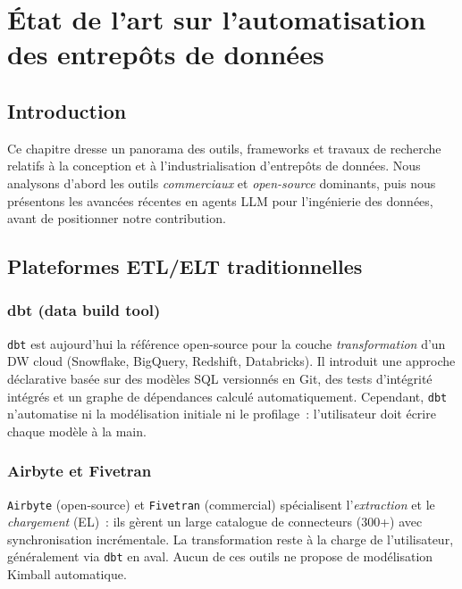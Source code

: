 \documentclass[12pt, a4paper]{report}
\begin{document}
\cleardoublepage

\chapter{État de l'art sur l'automatisation des entrepôts de données}
\label{chap:etat}

\section{Introduction}
Ce chapitre dresse un panorama des outils, frameworks et travaux de
recherche relatifs à la conception et à l'industrialisation
d'entrepôts de données. Nous analysons d'abord les outils
\emph{commerciaux} et \emph{open-source} dominants, puis nous présentons
les avancées récentes en agents \ac{LLM} pour l'ingénierie des données,
avant de positionner notre contribution.

\section{Plateformes ETL/ELT traditionnelles}

\subsection{dbt (data build tool)}
\texttt{dbt} est aujourd'hui la référence open-source pour la couche
\emph{transformation} d'un \ac{DW} cloud (Snowflake, BigQuery,
Redshift, Databricks). Il introduit une approche déclarative basée
sur des modèles \ac{SQL} versionnés en Git, des tests d'intégrité
intégrés et un graphe de dépendances calculé automatiquement.
Cependant, \texttt{dbt} n'automatise ni la modélisation initiale ni
le profilage~: l'utilisateur doit écrire chaque modèle à la main.

\subsection{Airbyte et Fivetran}
\texttt{Airbyte} (open-source) et \texttt{Fivetran} (commercial)
spécialisent l'\emph{extraction} et le \emph{chargement} (\ac{EL})~:
ils gèrent un large catalogue de connecteurs (300+) avec
synchronisation incrémentale. La transformation reste à la charge
de l'utilisateur, généralement via \texttt{dbt} en aval. Aucun de
ces outils ne propose de modélisation Kimball automatique.
\end{document}

